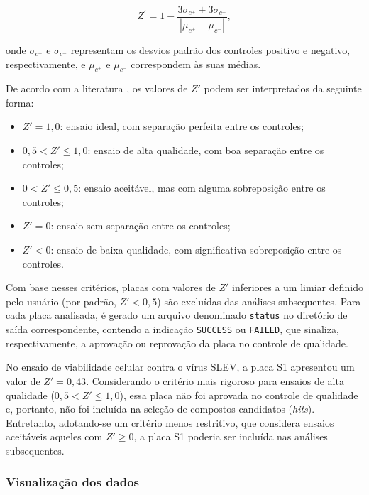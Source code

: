 \documentclass[12pt]{article}
\begin{document}
\begin{equation}
  Z^\prime = 1 - \frac{3\sigma_{c^{+}} + 3\sigma_{c^{-}}}{\left|\mu_{c^{+}} - \mu_{c^{-}}\right|},
\end{equation}

onde $\sigma _{c^{+}}$ e $\sigma _{c^{-}}$ representam os desvios padrão dos controles positivo e negativo, respectivamente, e $\mu _{c^{+}}$ e $\mu _{c^{-}}$ correspondem às suas médias.

De acordo com a literatura \cite{Zhang1999,Bray2004}, os valores de $Z'$ podem ser interpretados da seguinte forma:

\begin{itemize}
  \item $Z' = 1,0$: ensaio ideal, com separação perfeita entre os controles;
  \item $0,5 < Z' \leq 1,0$: ensaio de alta qualidade, com boa separação entre os controles;
  \item $0 < Z' \leq 0,5$: ensaio aceitável, mas com alguma sobreposição entre os controles;
  \item $Z' = 0$: ensaio sem separação entre os controles;
  \item $Z' < 0$: ensaio de baixa qualidade, com significativa sobreposição entre os controles.
\end{itemize}

Com base nesses critérios, placas com valores de $Z'$ inferiores a um limiar definido pelo usuário (por padrão, $Z' < 0,5$) são excluídas das análises subsequentes. Para cada placa analisada, é gerado um arquivo denominado \texttt{status} no diretório de saída correspondente, contendo a indicação \texttt{SUCCESS} ou \texttt{FAILED}, que sinaliza, respectivamente, a aprovação ou reprovação da placa no controle de qualidade.

No ensaio de viabilidade celular contra o vírus SLEV, a placa S1 apresentou um valor de $Z' = 0,43$. Considerando o critério mais rigoroso para ensaios de alta qualidade ($0,5 < Z' \leq 1,0$), essa placa não foi aprovada no controle de qualidade e, portanto, não foi incluída na seleção de compostos candidatos (\textit{hits}). Entretanto, adotando-se um critério menos restritivo, que considera ensaios aceitáveis aqueles com $Z' \ge 0$, a placa S1 poderia ser incluída nas análises subsequentes.

\subsubsection{Visualização dos dados}
\end{document}

